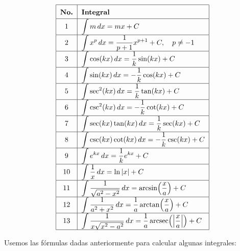 \[
\renewcommand{\arraystretch}{1.6}
\begin{tabular}{|c|l|}
\hline
\textbf{No.} & \textbf{Integral} \\ \hline

1 &
$\displaystyle \int m\,dx = mx + C$ \\ \hline

2 &
$\displaystyle \int x^{p}\,dx = \frac{1}{p+1}x^{p+1}+C,
\quad p\neq -1$ \\ \hline

3 &
$\displaystyle \int \cos(kx)\,dx = \frac{1}{k}\sin(kx)+C$ \\ \hline

4 &
$\displaystyle \int \sin(kx)\,dx = -\frac{1}{k}\cos(kx)+C$ \\ \hline

5 &
$\displaystyle \int \sec^{2}(kx)\,dx = \frac{1}{k}\tan(kx)+C$ \\ \hline

6 &
$\displaystyle \int \csc^{2}(kx)\,dx = -\frac{1}{k}\cot(kx)+C$ \\ \hline

7 &
$\displaystyle \int \sec(kx)\tan(kx)\,dx = \frac{1}{k}\sec(kx)+C$ \\ \hline

8 &
$\displaystyle \int \csc(kx)\cot(kx)\,dx = -\frac{1}{k}\csc(kx)+C$ \\ \hline

9 &
$\displaystyle \int e^{kx}\,dx = \frac{1}{k}e^{kx}+C$ \\ \hline

10 &
$\displaystyle \int \frac{1}{x}\,dx = \ln|x|+C$ \\ \hline

11 &
$\displaystyle \int \frac{1}{\sqrt{a^{2}-x^{2}}}\,dx
= \arcsin\!\left(\frac{x}{a}\right)+C$ \\ \hline

12 &
$\displaystyle \int \frac{1}{a^{2}+x^{2}}\,dx
= \frac{1}{a}\arctan\!\left(\frac{x}{a}\right)+C$ \\ \hline

13 &
$\displaystyle \int \frac{1}{x\sqrt{x^{2}-a^{2}}}\,dx
= \frac{1}{a}\operatorname{arcsec}
\!\left(\left|\frac{x}{a}\right|\right)+C$ \\ \hline

\end{tabular}
\]




\begin{ejemplo}
\textnormal{Usemos las fórmulas dadas anteriormente para calcular algunas integrales:}
\end{ejemplo}

